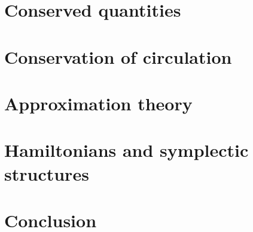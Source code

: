 \documentclass[12pt]{amsart}
\begin{document}
\section{Conserved quantities}
\label{sec:conserved_quantities}


\section{Conservation of circulation}
\label{sec:circulation}


\section{Approximation theory}
\label{sec:approximation_theory}


\section{Hamiltonians and symplectic structures}
\label{sec:symplectic}


\section{Conclusion}




\end{document}
